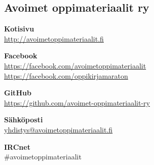 \subsection*{Avoimet oppimateriaalit ry}

\textbf{Kotisivu} \\
\url{http://avoimetoppimateriaalit.fi}

\textbf{Facebook} \\
\url{https://facebook.com/avoimetoppimateriaalit} \\
\url{https://facebook.com/oppikirjamaraton}

\textbf{GitHub} \\
\url{https://github.com/avoimet-oppimateriaalit-ry}

\textbf{Sähköposti} \\
\href{mailto:yhdistys@avoimetoppimateriaalit.fi}{yhdistys@avoimetoppimateriaalit.fi}

\textbf{IRCnet} \\
\#avoimetoppimateriaalit
